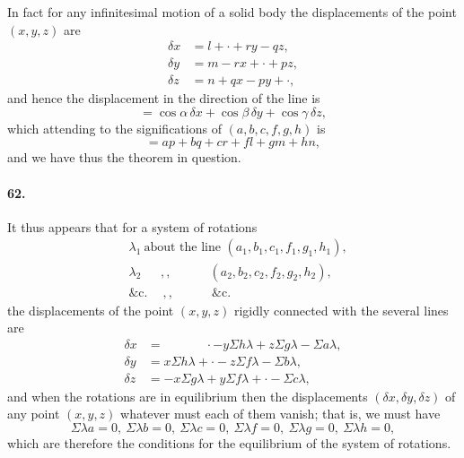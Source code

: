 \documentclass[11pt,a4paper]{article}
\begin{document}
In fact for any infinitesimal motion of a solid body the displacements of the point
$(x, y, z)$ are
\begin{align*}
\delta x &= l + \cdot + ry - qz, \\
\delta y &= m - rx + \cdot + pz, \\
\delta z &= n + qx - py + \cdot,
\end{align*}
and hence the displacement in the direction of the line is
\[
{} = \cos\alpha\,\delta x + \cos\beta\,\delta y + \cos\gamma\,\delta z,
\]
which attending to the significations of $(a,b,c,f,g,h)$ is
\[
{} = ap + bq + cr + fl + gm + hn,
\]
and we have thus the theorem in question.

\paragraph{62.}
It thus appears that for a system of rotations
\begin{align*}
&\lambda_1\ \text{about the line } (a_1, b_1, c_1, f_1, g_1, h_1), \\
&\lambda_2\ \quad\,\,,, \quad\quad\quad (a_2, b_2, c_2, f_2, g_2, h_2), \\
&\&\text{c.}\ \quad,,\quad\quad\quad \&\text{c.}
\end{align*}
the displacements of the point $(x, y, z)$ rigidly connected with the several lines are
\begin{align*}
\delta x &= \phantom{-x\Sigma h\lambda} \cdot - y\Sigma h\lambda + z\Sigma g\lambda - \Sigma a\lambda, \\
\delta y &= x\Sigma h\lambda + \cdot - z\Sigma f\lambda - \Sigma b\lambda, \\
\delta z &= -x\Sigma g\lambda + y\Sigma f\lambda + \cdot - \Sigma c\lambda,
\end{align*}
and when the rotations are in equilibrium then the displacements
$(\delta x, \delta y, \delta z)$ of any point $(x, y, z)$ whatever must each of them vanish; that
is, we must have
\[
\Sigma\lambda a = 0,\ \Sigma\lambda b = 0,\ \Sigma\lambda c = 0,\
 \Sigma\lambda f = 0,\ \Sigma\lambda g = 0,\ \Sigma\lambda h = 0,
\]
which are therefore the conditions for the equilibrium of the system of rotations.
\end{document}
